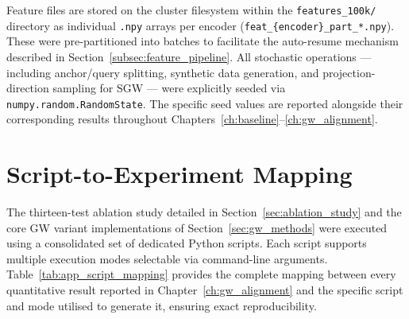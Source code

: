 Feature files are stored on the cluster filesystem within the \texttt{features\_100k/} directory as individual \texttt{.npy} arrays per encoder (\texttt{feat\_\{encoder\}\_part\_*.npy}). These were pre-partitioned into batches to facilitate the auto-resume mechanism described in Section~\ref{subsec:feature_pipeline}. All stochastic operations --- including anchor/query splitting, synthetic data generation, and projection-direction sampling for SGW --- were explicitly seeded via \texttt{numpy.random.RandomState}. The specific seed values are reported alongside their corresponding results throughout Chapters~\ref{ch:baseline}--\ref{ch:gw_alignment}.

\section{Script-to-Experiment Mapping}
\label{sec:app_script_mapping}

The thirteen-test ablation study detailed in Section~\ref{sec:ablation_study} and the core GW variant implementations of Section~\ref{sec:gw_methods} were executed using a consolidated set of dedicated Python scripts. Each script supports multiple execution modes selectable via command-line arguments. Table~\ref{tab:app_script_mapping} provides the complete mapping between every quantitative result reported in Chapter~\ref{ch:gw_alignment} and the specific script and mode utilised to generate it, ensuring exact reproducibility.

